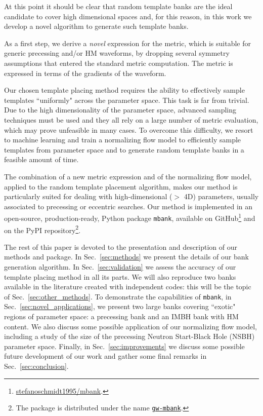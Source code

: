 \documentclass[twocolumn,showpacs,preprintnumbers,nofootinbib,prd,
superscriptaddress,10pt]{revtex4-2}
\begin{document}
At this point it should be clear that random template banks are the ideal candidate to cover high dimensional spaces and, for this reason, in this work we develop a novel algorithm to generate such template banks.

As a first step, we derive a {\it novel} expression for the metric, which is suitable for generic precessing and/or HM waveforms, by dropping several symmetry assumptions that entered the standard metric computation. The metric is expressed in terms of the gradients of the waveform.

Our chosen template placing method requires the ability to effectively sample templates ``uniformly" across the parameter space.
This task is far from trivial. Due to the high dimensionality of the parameter space, advanced sampling techniques must be used and they all rely on a large number of metric evaluation, which may prove unfeasible in many cases. To overcome this difficulty, we resort to machine learning and train a normalizing flow model to efficiently sample templates from parameter space and to generate random template banks in a feasible amount of time.

The combination of a new metric expression and of the normalizing flow model, applied to the random template placement algorithm, makes our method is particularly suited for dealing with high-dimensional ($>$ 4D) parameters, usually associated to precessing or eccentric searches.
Our method is implemented in an open-source, production-ready, Python package \texttt{mbank}, available on GitHub\footnote{
\href{https://github.com/stefanoschmidt1995/mbank}{stefanoschmidt1995/mbank}.}
and on the PyPI repository\footnote{
The package is distributed under the name \texttt{\href{https://pypi.org/project/gw-mbank/}{gw-mbank}}.
}.

The rest of this paper is devoted to the presentation and description of our methods and package.
In Sec.~\ref{sec:methods} we present the details of our bank generation algorithm.
In Sec.~\ref{sec:validation} we assess the accuracy of our template placing method in all its parts.
We will also reproduce two banks available in the literature \cite{Harry:2017weg, Sakon:2022ibh} created with independent codes: this will be the topic of Sec.~\ref{sec:other_methods}.
To demonstrate the capabilities of \texttt{mbank}, in Sec.~\ref{sec:novel_applications}, we present two large banks covering ``exotic" regions of parameter space: a precessing bank and an IMBH bank with HM content. We also discuss some possible application of our normalizing flow model, including a study of the size of the precessing Neutron Start-Black Hole (NSBH) parameter space.
Finally, in Sec.~\ref{sec:improvements} we discuss some possible future development of our work and gather some final remarks in Sec.~\ref{sec:conclusion}.
\end{document}
